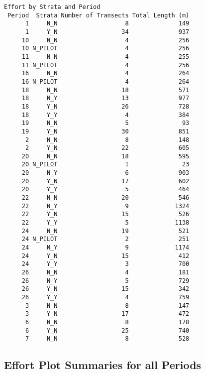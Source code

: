 \documentclass[
]{article}
\begin{document}
\begin{verbatim}
Effort by Strata and Period
 Period  Strata Number of Transects Total Length (m)
      1     N_N                   8              149
      1     Y_N                  34              937
     10     N_N                   4              256
     10 N_PILOT                   4              256
     11     N_N                   4              255
     11 N_PILOT                   4              256
     16     N_N                   4              264
     16 N_PILOT                   4              264
     18     N_N                  18              571
     18     N_Y                  13              977
     18     Y_N                  26              728
     18     Y_Y                   4              384
     19     N_N                   5               93
     19     Y_N                  30              851
      2     N_N                   8              148
      2     Y_N                  22              605
     20     N_N                  18              595
     20 N_PILOT                   1               23
     20     N_Y                   6              903
     20     Y_N                  17              602
     20     Y_Y                   5              464
     22     N_N                  20              546
     22     N_Y                   9             1324
     22     Y_N                  15              526
     22     Y_Y                   5             1138
     24     N_N                  19              521
     24 N_PILOT                   2              251
     24     N_Y                   9             1174
     24     Y_N                  15              412
     24     Y_Y                   3              700
     26     N_N                   4              181
     26     N_Y                   5              729
     26     Y_N                  15              342
     26     Y_Y                   4              759
      3     N_N                   8              147
      3     Y_N                  17              472
      6     N_N                   8              178
      6     Y_N                  25              740
      7     N_N                   8              528
\end{verbatim}

\newpage

\hypertarget{effort-plot-summaries-for-all-periods}{%
\subsection{Effort Plot Summaries for all
Periods}\label{effort-plot-summaries-for-all-periods}}
\end{document}
